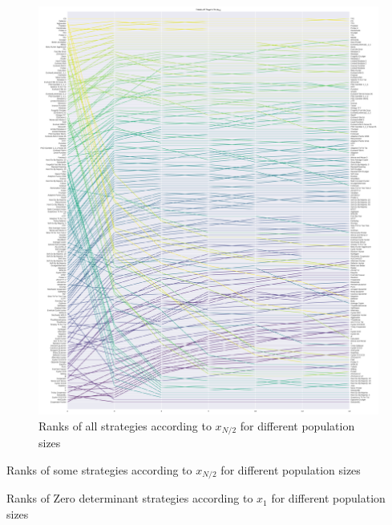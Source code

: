 \documentclass{article}
\begin{document}
\begin{figure}[!hbtp]
    \centering
    \includegraphics[height=.9\textheight]{./img/average_rank_vs_population_size_coexist.pdf}
    \caption{Ranks of all strategies according to \(x_{N/2}\) for different
    population sizes}
    \label{fig:ranks_v_size_coexist}
\end{figure}

\begin{table}[!hbtp]
    \centering
    \scriptsize
    
    \caption{Ranks of some strategies according to \(x_{N/2}\) for different
    population sizes}
    \label{tbl:ranks_v_size_coexist}
\end{table}


\begin{table}[!hbtp]
    \centering
    \scriptsize
    
    \caption{Ranks of Zero determinant strategies according to \(x_{1}\) for different
    population sizes}
    \label{tbl:ZD_ranks_v_invade}
\end{table}
\end{document}
